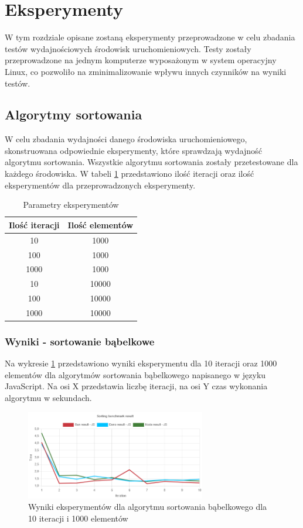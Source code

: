 \section{Eksperymenty}
W tym rozdziale opisane zostaną eksperymenty przeprowadzone w celu zbadania testów wydajnościowych środowisk uruchomieniowych. Testy zostały przeprowadzone na jednym komputerze wyposażonym w system operacyjny Linux, co pozwoliło na zminimalizowanie wpływu innych czynników na wyniki testów. 

\subsection{Algorytmy sortowania}
W celu zbadania wydajności danego środowiska uruchomieniowego, skonstruowana odpowiednie eksperymenty, które sprawdzają wydajność algorytmu sortowania. Wszystkie algorytmu sortowania zostały przetestowane dla każdego środowiska. W tabeli \ref{tab:sorting_experiments} przedstawiono ilość iteracji oraz ilość eksperymentów dla przeprowadzonych eksperymenty.

\begin{table}[H]
  \centering
  \begin{tabular}{|c|c|}
    \hline
    \textbf{Ilość iteracji} & \textbf{Ilość elementów} \\ \hline
    10 & 1000 \\ \hline
    100 & 1000 \\ \hline
    1000 & 1000 \\ \hline
    10 & 10000 \\ \hline
    100 & 10000 \\ \hline
    1000 & 10000 \\ \hline
  \end{tabular}
  \caption{Parametry eksperymentów}
  \label{tab:sorting_experiments}
\end{table}

\subsubsection{Wyniki - sortowanie bąbelkowe}
Na wykresie \ref{fig:bubble_sorting_e1} przedstawiono wyniki eksperymentu dla 10 iteracji oraz 1000 elementów dla algorytmów sortowania bąbelkowego napisanego w języku JavaScript. Na osi X przedstawia liczbę iteracji, na osi Y czas wykonania algorytmu w sekundach. 

\begin{figure}[H]
  \centering
  \includegraphics[width=0.7\textwidth]{Figures/sorting/bubble/e1_js.png}
  \caption{Wyniki eksperymentów dla algorytmu sortowania bąbelkowego dla 10 iteracji i 1000 elementów}
  \label{fig:bubble_sorting_e1}
\end{figure}

